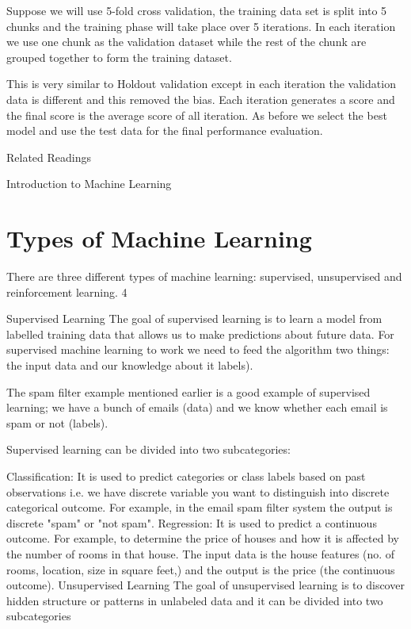 Suppose we will use 5-fold cross validation, the training data set is split into 5 chunks and the training phase will take place over 5 iterations. In each iteration we use one chunk as the validation dataset while the rest of the chunk are grouped together to form the training dataset.

This is very similar to Holdout validation except in each iteration the validation data is different and this removed the bias. Each iteration generates a score and the final score is the average score of all iteration. As before we select the best model and use the test data for the final performance evaluation.

Related Readings

Introduction to Machine Learning

\section{Types of Machine Learning}

There are three different types of machine learning: supervised, unsupervised and reinforcement learning. 4

Supervised Learning
The goal of supervised learning is to learn a model from labelled training data that allows us to make predictions about future data. For supervised machine learning to work we need to feed the algorithm two things: the input data and our knowledge about it labels).

The spam filter example mentioned earlier is a good example of supervised learning; we have a bunch of emails (data) and we know whether each email is spam or not (labels).


Supervised learning can be divided into two subcategories:

Classification: It is used to predict categories or class labels based on past observations i.e. we have discrete variable you want to distinguish into discrete categorical outcome. For example, in the email spam filter system the output is discrete "spam" or "not spam".
Regression: It is used to predict a continuous outcome. For example, to determine the price of houses and how it is affected by the number of rooms in that house. The input data is the house features (no. of rooms, location, size in square feet,) and the output is the price (the continuous outcome).
Unsupervised Learning
The goal of unsupervised learning is to discover hidden structure or patterns in unlabeled data and it can be divided into two subcategories

